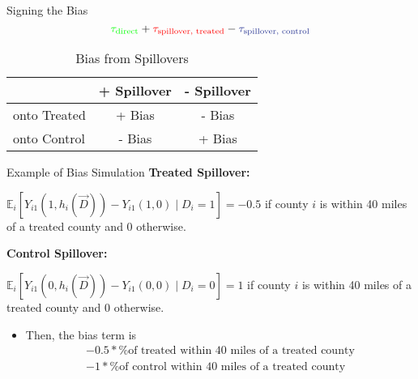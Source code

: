 \documentclass[aspectratio=43]{beamer}
\begin{document}
\begin{frame}{Signing the Bias}
    \[ 
        \textcolor{green}{\tau_{\text{direct}}} + \textcolor{red}{\tau_{\text{spillover, treated}}} - \textcolor{purple}{\tau_{\text{spillover, control}}}    
    \]

    \begin{table}
        \caption{Bias from Spillovers}
        \begin{tabular}{|l|cc|}
            \hline
            & + Spillover & - Spillover \\ \hline
            onto Treated & + Bias & - Bias \\
            onto Control & - Bias & + Bias \\
            \hline
        \end{tabular}
    \end{table}
\end{frame}

\begin{frame}{Example of Bias Simulation}
    \textbf{Treated Spillover:}
    
    $\mathbb{E}_i \left[ Y_{i1}(1, h_i(\vec{D})) - Y_{i1}(1, 0) \mid D_i = 1 \right] = -0.5$ if county $i$ is within 40 miles of a treated county and $0$ otherwise.
        
    \textbf{Control Spillover:}
    
    $\mathbb{E}_i \left[ Y_{i1}(0, h_i(\vec{D})) - Y_{i1}(0, 0) \mid D_i = 0 \right] = 1$ if county $i$ is within 40 miles of a treated county and $0$ otherwise.
        
    \begin{itemize}
        \item Then, the bias term is \begin{align*}
            -0.5 * \text{\% of treated within 40 miles of a treated county} \\
            -1 * \text{\% of control within 40 miles of a treated county}
        \end{align*}
    \end{itemize}
\end{frame}
\end{document}
